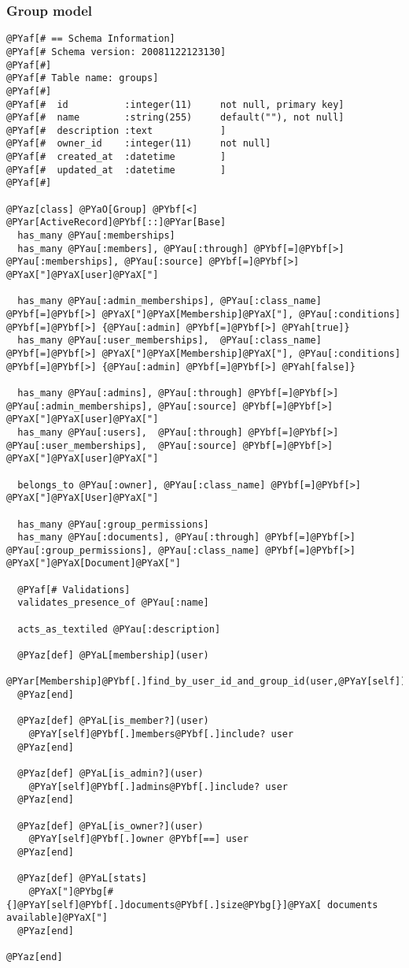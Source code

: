 
\subsubsection{Group model} %
\label{ssub:group_model}

\begin{Verbatim}[commandchars=@\[\]]
@PYaf[# == Schema Information]
@PYaf[# Schema version: 20081122123130]
@PYaf[#]
@PYaf[# Table name: groups]
@PYaf[#]
@PYaf[#  id          :integer(11)     not null, primary key]
@PYaf[#  name        :string(255)     default(""), not null]
@PYaf[#  description :text            ]
@PYaf[#  owner_id    :integer(11)     not null]
@PYaf[#  created_at  :datetime        ]
@PYaf[#  updated_at  :datetime        ]
@PYaf[#]

@PYaz[class] @PYaO[Group] @PYbf[<] @PYar[ActiveRecord]@PYbf[::]@PYar[Base]
  has_many @PYau[:memberships]
  has_many @PYau[:members], @PYau[:through] @PYbf[=]@PYbf[>] @PYau[:memberships], @PYau[:source] @PYbf[=]@PYbf[>] @PYaX["]@PYaX[user]@PYaX["]  
  
  has_many @PYau[:admin_memberships], @PYau[:class_name] @PYbf[=]@PYbf[>] @PYaX["]@PYaX[Membership]@PYaX["], @PYau[:conditions] @PYbf[=]@PYbf[>] {@PYau[:admin] @PYbf[=]@PYbf[>] @PYah[true]}
  has_many @PYau[:user_memberships],  @PYau[:class_name] @PYbf[=]@PYbf[>] @PYaX["]@PYaX[Membership]@PYaX["], @PYau[:conditions] @PYbf[=]@PYbf[>] {@PYau[:admin] @PYbf[=]@PYbf[>] @PYah[false]}
  
  has_many @PYau[:admins], @PYau[:through] @PYbf[=]@PYbf[>] @PYau[:admin_memberships], @PYau[:source] @PYbf[=]@PYbf[>] @PYaX["]@PYaX[user]@PYaX["]
  has_many @PYau[:users],  @PYau[:through] @PYbf[=]@PYbf[>] @PYau[:user_memberships],  @PYau[:source] @PYbf[=]@PYbf[>] @PYaX["]@PYaX[user]@PYaX["]
  
  belongs_to @PYau[:owner], @PYau[:class_name] @PYbf[=]@PYbf[>] @PYaX["]@PYaX[User]@PYaX["]  
  
  has_many @PYau[:group_permissions]
  has_many @PYau[:documents], @PYau[:through] @PYbf[=]@PYbf[>] @PYau[:group_permissions], @PYau[:class_name] @PYbf[=]@PYbf[>] @PYaX["]@PYaX[Document]@PYaX["]
  
  @PYaf[# Validations]
  validates_presence_of @PYau[:name]
  
  acts_as_textiled @PYau[:description]
  
  @PYaz[def] @PYaL[membership](user)
    @PYar[Membership]@PYbf[.]find_by_user_id_and_group_id(user,@PYaY[self])
  @PYaz[end]
  
  @PYaz[def] @PYaL[is_member?](user)
    @PYaY[self]@PYbf[.]members@PYbf[.]include? user
  @PYaz[end]
  
  @PYaz[def] @PYaL[is_admin?](user)
    @PYaY[self]@PYbf[.]admins@PYbf[.]include? user
  @PYaz[end]
  
  @PYaz[def] @PYaL[is_owner?](user)
    @PYaY[self]@PYbf[.]owner @PYbf[==] user
  @PYaz[end]
  
  @PYaz[def] @PYaL[stats]
    @PYaX["]@PYbg[#{]@PYaY[self]@PYbf[.]documents@PYbf[.]size@PYbg[}]@PYaX[ documents available]@PYaX["]
  @PYaz[end]
  
@PYaz[end]
\end{Verbatim}


